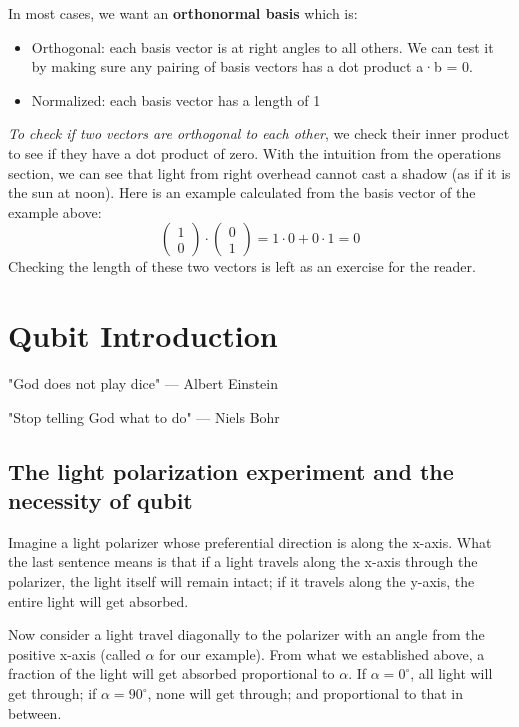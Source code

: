 In most cases, we want an \textbf{orthonormal basis} which is:
\begin{itemize}
    \item Orthogonal: each basis vector is at right angles to all others. We can test it by making sure any pairing of basis vectors has a dot product a·b = 0.
    \item Normalized: each basis vector has a length of 1
\end{itemize}

\textit{To check if two vectors are orthogonal to each other}, we check their inner product to see if they have a dot product of zero. With the intuition from the operations section, we can see that light from right overhead cannot cast a shadow (as if it is the sun at noon). Here is an example calculated from the basis vector of the example above:
\[
    \begin{pmatrix}1 \\ 0\end{pmatrix} \cdot \begin{pmatrix}0 \\ 1\end{pmatrix}
    = 1 \cdot 0 + 0 \cdot 1
    = 0
\]
Checking the length of these two vectors is left as an exercise for the reader.

\chapter{Qubit Introduction}
"God does not play dice" — Albert Einstein

"Stop telling God what to do" — Niels Bohr

\section{The light polarization experiment and the necessity of qubit}
Imagine a light polarizer whose preferential direction is along the x-axis. What the last sentence means is that if a light travels along the x-axis through the polarizer, the light itself will remain intact; if it travels along the y-axis, the entire light will get absorbed. 

Now consider a light travel diagonally to the polarizer with an angle from the positive x-axis (called $\alpha$ for our example). From what we established above, a fraction of the light will get absorbed proportional to $\alpha$. If $\alpha = 0^\circ$, all light will get through; if $\alpha = 90^\circ$, none will get through; and proportional to that in between.

